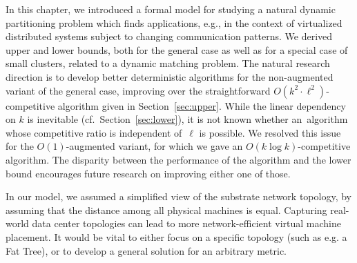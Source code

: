 
In this chapter, we introduced a formal model for studying a natural dynamic partitioning problem which
finds applications, e.g., in the context of virtualized distributed systems
subject to changing communication patterns. We derived upper and lower bounds,
both for the general case as well as for a special case of small clusters, related to a dynamic
matching problem. The natural research direction is to develop better
deterministic algorithms for the non-augmented variant of the general case,
improving over the straightforward $O(k^2 \cdot \ell^2)$-competitive algorithm
given in Section~\ref{sec:upper}. While the linear dependency on $k$ is
inevitable (cf.~Section~\ref{sec:lower}), it is not known whether
an~algorithm whose competitive ratio is independent of~$\ell$ is possible. We
resolved this issue for the $O(1)$-augmented variant, for which we gave an
$O(k \log k)$-competitive algorithm.
The disparity between the performance of the algorithm and the lower bound encourages future research on improving either one of those.

In our model, we assumed a simplified view of the substrate network topology, by assuming that the distance among all physical machines is equal.
Capturing real-world data center topologies can lead to more network-efficient virtual machine placement.
It would be vital to either focus on a specific topology (such as e.g. a Fat Tree), or to develop a general solution for an arbitrary metric.
